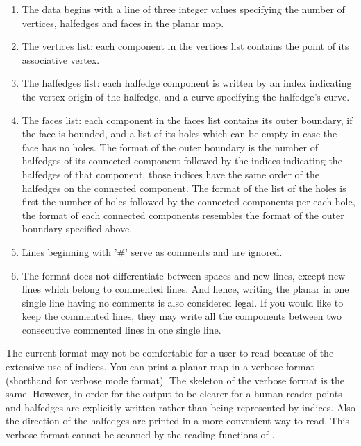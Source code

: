 \begin{ccAdvanced}
\begin{enumerate}
\item The data begins with a line of three integer values specifying
the number of vertices, halfedges and faces in the planar map.
\item The vertices list: each component in the vertices list contains
the point of its associative vertex. 
\item The halfedges list: each halfedge component is written by an
index indicating the vertex origin of the halfedge, and a curve
specifying the halfedge's curve.
\item The faces list: each component in the faces list contains its
outer boundary, if the face is bounded, and a list of its holes which
can be empty in case the face has no holes. The format of the outer
boundary is the number of halfedges of its connected component
followed by the indices indicating the halfedges of that component,
those indices have the same order of the halfedges on the connected
component. The format of the list of the holes is first the number of
holes followed by the connected components per each hole, the format
of each connected components resembles the format of the outer
boundary specified above.
\item Lines beginning with '\#' serve as comments and are ignored.
\item The format does not differentiate between spaces and new lines, 
except new lines which belong to commented lines. 
And hence, writing the planar in one single line having no comments is
also considered legal. If you would like to keep the commented
lines, they may write all the components between two consecutive
commented lines in one single line.

\end{enumerate}

The current format may not be comfortable for a user to read because
of the extensive use of indices. You can print a planar map in a
verbose format (shorthand for verbose mode format).  The skeleton of 
the verbose format is the same. However, in order for the output to be
clearer for a human reader points and halfedges are explicitly written
rather than being represented by indices. Also the direction of the
halfedges are printed in a more convenient way to read. This verbose
format cannot be scanned by the reading functions of
.

\ccExample


\end{ccAdvanced}
